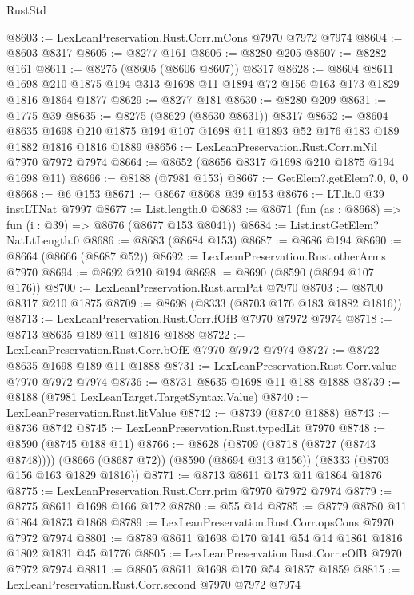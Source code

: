 \begin{lexlean}{RustStd}
\begin{coremodule}
@8603 := LexLeanPreservation.Rust.Corr.mCons @7970 @7972 @7974
@8604 := @8603 @8317
@8605 := @8277 @161
@8606 := @8280 @205
@8607 := @8282 @161
@8611 := @8275 (@8605 (@8606 @8607)) @8317
@8628 := @8604
    @8611
    @1698
    @210
    @1875
    @194
    @313
    @1698
    @11
    @1894
    @72
    @156
    @163
    @173
    @1829
    @1816
    @1864
    @1877
@8629 := @8277 @181
@8630 := @8280 @209
@8631 := @1775 @39
@8635 := @8275 (@8629 (@8630 @8631)) @8317
@8652 := @8604
    @8635
    @1698
    @210
    @1875
    @194
    @107
    @1698
    @11
    @1893
    @52
    @176
    @183
    @189
    @1882
    @1816
    @1816
    @1889
@8656 := LexLeanPreservation.Rust.Corr.mNil @7970 @7972 @7974
@8664 := @8652 (@8656 @8317 @1698 @210 @1875 @194 @1698 @11)
@8666 := @8188 (@7981 @153)
@8667 := GetElem?.getElem?.{0, 0, 0}
@8668 := @6 @153
@8671 := @8667 @8668 @39 @153
@8676 := LT.lt.{0} @39 instLTNat @7997
@8677 := List.length.{0}
@8683 := @8671 (fun (as : @8668) => fun (i : @39) => @8676 (@8677 @153 @8041))
@8684 := List.instGetElem?NatLtLength.{0}
@8686 := @8683 (@8684 @153)
@8687 := @8686 @194
@8690 := @8664 (@8666 (@8687 @52))
@8692 := LexLeanPreservation.Rust.otherArms @7970
@8694 := @8692 @210 @194
@8698 := @8690 (@8590 (@8694 @107 @176))
@8700 := LexLeanPreservation.Rust.armPat @7970
@8703 := @8700 @8317 @210 @1875
@8709 := @8698 (@8333 (@8703 @176 @183 @1882 @1816))
@8713 := LexLeanPreservation.Rust.Corr.fOfB @7970 @7972 @7974
@8718 := @8713 @8635 @189 @11 @1816 @1888
@8722 := LexLeanPreservation.Rust.Corr.bOfE @7970 @7972 @7974
@8727 := @8722 @8635 @1698 @189 @11 @1888
@8731 := LexLeanPreservation.Rust.Corr.value @7970 @7972 @7974
@8736 := @8731 @8635 @1698 @11 @188 @1888
@8739 := @8188 (@7981 LexLeanTarget.TargetSyntax.Value)
@8740 := LexLeanPreservation.Rust.litValue
@8742 := @8739 (@8740 @1888)
@8743 := @8736 @8742
@8745 := LexLeanPreservation.Rust.typedLit @7970
@8748 := @8590 (@8745 @188 @11)
@8766 := @8628
    (@8709 (@8718 (@8727 (@8743 @8748))))
    (@8666 (@8687 @72))
    (@8590 (@8694 @313 @156))
    (@8333 (@8703 @156 @163 @1829 @1816))
@8771 := @8713 @8611 @173 @11 @1864 @1876
@8775 := LexLeanPreservation.Rust.Corr.prim @7970 @7972 @7974
@8779 := @8775 @8611 @1698 @166 @172
@8780 := @55 @14
@8785 := @8779 @8780 @11 @1864 @1873 @1868
@8789 := LexLeanPreservation.Rust.Corr.opsCons @7970 @7972 @7974
@8801 := @8789 @8611 @1698 @170 @141 @54 @14 @1861 @1816 @1802 @1831 @45 @1776
@8805 := LexLeanPreservation.Rust.Corr.eOfB @7970 @7972 @7974
@8811 := @8805 @8611 @1698 @170 @54 @1857 @1859
@8815 := LexLeanPreservation.Rust.Corr.second @7970 @7972 @7974

\end{coremodule}
\end{lexlean}
